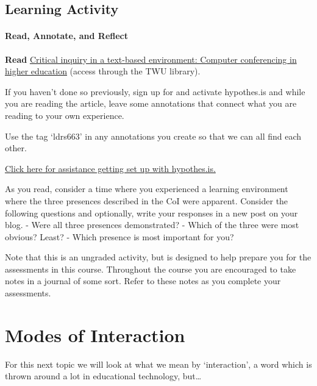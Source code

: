 \documentclass[
]{book}
\begin{document}
\hypertarget{learning-activity}{%
\subsection*{Learning Activity}\label{learning-activity}}

\begin{reflect}
\hypertarget{read-annotate-and-reflect}{%
\paragraph{Read, Annotate, and
Reflect}\label{read-annotate-and-reflect}}

\textbf{Read}
\href{https://www-sciencedirect-com.twu.idm.oclc.org/science/article/pii/S1096751600000166}{Critical
inquiry in a text-based environment: Computer conferencing in higher
education} (access through the TWU library).

If you haven't done so previously, sign up for and activate hypothes.is
and while you are reading the article, leave some annotations that
connect what you are reading to your own experience.

Use the tag `ldrs663' in any annotations you create so that we can all
find each other.

\href{http://create.twu.ca/help/other-web-tools/hypothesis}{Click here
for assistance getting set up with hypothes.is.}

As you read, consider a time where you experienced a learning
environment where the three presences described in the CoI were
apparent. Consider the following questions and optionally, write your
responses in a new post on your blog. - Were all three presences
demonstrated? - Which of the three were most obvious? Least? - Which
presence is most important for you?

Note that this is an ungraded activity, but is designed to help prepare
you for the assessments in this course. Throughout the course you are
encouraged to take notes in a journal of some sort. Refer to these notes
as you complete your assessments.
\end{reflect}

\hypertarget{modes-of-interaction}{%
\section{Modes of Interaction}\label{modes-of-interaction}}

For this next topic we will look at what we mean by `interaction', a word which is thrown around a lot in educational technology, but\ldots{}
\end{document}
